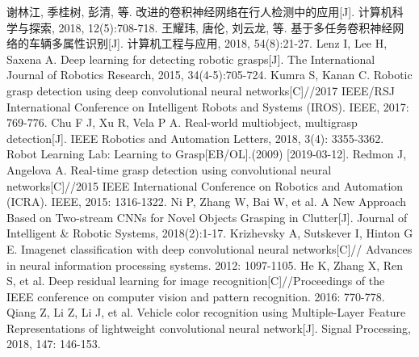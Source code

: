 \documentclass[no-math,bwprint]{YangThesis}
\begin{document}
\newpage
\begin{thebibliography}{9}%
 谢林江, 季桂树, 彭清, 等. 改进的卷积神经网络在行人检测中的应用[J].  计算机科学与探索,  2018,  12(5):708-718.
王耀玮, 唐伦, 刘云龙, 等. 基于多任务卷积神经网络的车辆多属性识别[J].  计算机工程与应用, 2018, 54(8):21-27.
 Lenz I, Lee H, Saxena A. Deep learning for detecting robotic grasps[J]. The International Journal of Robotics Research, 2015, 34(4-5):705-724.
 Kumra S, Kanan C. Robotic grasp detection using deep convolutional neural networks[C]//2017 IEEE/RSJ International Conference on Intelligent Robots and Systems (IROS). IEEE, 2017: 769-776.
 Chu F J, Xu R, Vela P A. Real-world multiobject, multigrasp detection[J]. IEEE Robotics and Automation Letters, 2018, 3(4): 3355-3362.
  Robot Learning Lab: Learning to Grasp[EB/OL].(2009) [2019-03-12].
  Redmon J, Angelova A. Real-time grasp detection using convolutional neural networks[C]//2015 IEEE International Conference on Robotics and Automation (ICRA). IEEE, 2015: 1316-1322.
 Ni P, Zhang W, Bai W, et al. A New Approach Based on Two-stream CNNs for Novel Objects Grasping in Clutter[J]. Journal of Intelligent \& Robotic Systems, 2018(2):1-17.
 Krizhevsky A, Sutskever I, Hinton G E. Imagenet classification with deep convolutional neural networks[C]// Advances in neural information processing systems. 2012: 1097-1105.
 He K, Zhang X, Ren S, et al. Deep residual learning for image recognition[C]//Proceedings of the IEEE conference on computer vision and pattern recognition. 2016: 770-778.
 Qiang Z, Li Z, Li J, et al. Vehicle color recognition using
Multiple-Layer Feature Representations of lightweight convolutional neural network[J]. Signal Processing, 2018, 147: 146-153. 


\end{thebibliography}
\end{document}

